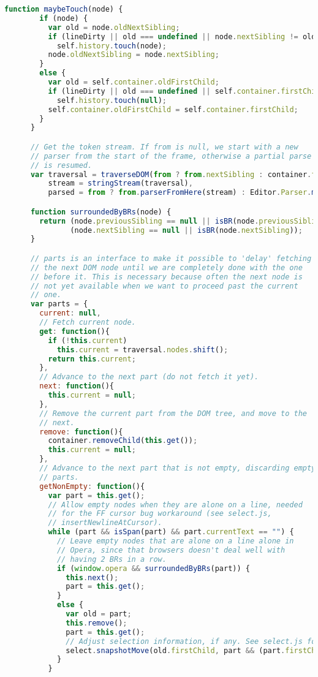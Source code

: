 \begin{lstlisting}[language=Javascript]
      function maybeTouch(node) {
        if (node) {
          var old = node.oldNextSibling;
          if (lineDirty || old === undefined || node.nextSibling != old)
            self.history.touch(node);
          node.oldNextSibling = node.nextSibling;
        }
        else {
          var old = self.container.oldFirstChild;
          if (lineDirty || old === undefined || self.container.firstChild != old)
            self.history.touch(null);
          self.container.oldFirstChild = self.container.firstChild;
        }
      }

      // Get the token stream. If from is null, we start with a new
      // parser from the start of the frame, otherwise a partial parse
      // is resumed.
      var traversal = traverseDOM(from ? from.nextSibling : container.firstChild),
          stream = stringStream(traversal),
          parsed = from ? from.parserFromHere(stream) : Editor.Parser.make(stream);

      function surroundedByBRs(node) {
        return (node.previousSibling == null || isBR(node.previousSibling)) &&
               (node.nextSibling == null || isBR(node.nextSibling));
      }

      // parts is an interface to make it possible to 'delay' fetching
      // the next DOM node until we are completely done with the one
      // before it. This is necessary because often the next node is
      // not yet available when we want to proceed past the current
      // one.
      var parts = {
        current: null,
        // Fetch current node.
        get: function(){
          if (!this.current)
            this.current = traversal.nodes.shift();
          return this.current;
        },
        // Advance to the next part (do not fetch it yet).
        next: function(){
          this.current = null;
        },
        // Remove the current part from the DOM tree, and move to the
        // next.
        remove: function(){
          container.removeChild(this.get());
          this.current = null;
        },
        // Advance to the next part that is not empty, discarding empty
        // parts.
        getNonEmpty: function(){
          var part = this.get();
          // Allow empty nodes when they are alone on a line, needed
          // for the FF cursor bug workaround (see select.js,
          // insertNewlineAtCursor).
          while (part && isSpan(part) && part.currentText == "") {
            // Leave empty nodes that are alone on a line alone in
            // Opera, since that browsers doesn't deal well with
            // having 2 BRs in a row.
            if (window.opera && surroundedByBRs(part)) {
              this.next();
              part = this.get();
            }
            else {
              var old = part;
              this.remove();
              part = this.get();
              // Adjust selection information, if any. See select.js for details.
              select.snapshotMove(old.firstChild, part && (part.firstChild || part), 0);
            }
          }
          

\end{lstlisting}

